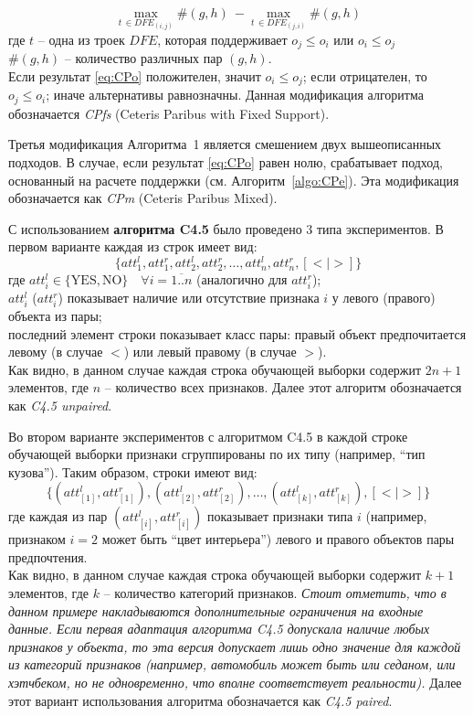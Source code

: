 	\begin{equation}
	\label{eq:CPo}
		\max_{t\, \in DFE_{(i,j)}}\#(g,h) \: - \max_{t\, \in DFE_{(j,i)}}\#(g,h)
	\end{equation}
	где $t$ – одна из троек $DFE$, которая поддерживает $o_j \leq o_i$ или $o_i \leq o_j$\\
	$\#(g,h)$ – количество различных пар $(g,h)$.\\
	Если результат \ref{eq:CPo} положителен, значит $o_i \leq o_j$; если отрицателен, то $o_j \leq o_i$; иначе альтернативы равнозначны. Данная модификация алгоритма обозначается \emph{CPfs} (Ceteris Paribus with Fixed Support).
	
	Третья модификация Алгоритма~1 является смешением двух вышеописанных подходов. В случае, если результат \ref{eq:CPo} равен нолю, срабатывает подход, основанный на расчете поддержки (см. Алгоритм~\ref{algo:CPe}). Эта модификация обозначается как \emph{CPm} (Ceteris Paribus Mixed).
	
	С использованием \textbf{алгоритма C4.5} было проведено 3 типа экспериментов. В первом варианте каждая из строк имеет вид: 
	\begin{equation}
	\label{eq:c4.5_unpaired_row}
	\{att_1^l, att_1^r, att_2^l, att_2^r, \dots, att_n^l, att_n^r, [< | >]\}
	\end{equation}
	где $att_i^l \in \{\text{YES}, \text{NO}\} \quad \forall i = \overline{1..n}$ (аналогично для $att_i^r$); \\
	$att_i^l$ ($att_i^r$) показывает наличие или отсутствие признака $i$ у левого (правого) объекта из пары; \\
	последний элемент строки показывает класс пары: правый объект предпочитается левому (в случае $<$) или левый правому (в случае $>$). \\
	Как видно, в данном случае каждая строка обучающей выборки содержит $2n + 1$ элементов, где $n$ – количество всех признаков. Далее этот алгоритм обозначается как \emph{C4.5 unpaired}.
	
	Во втором варианте экспериментов с алгоритмом C4.5 в каждой строке обучающей выборки признаки сгруппированы по их типу (например, ``тип кузова''). Таким образом, строки имеют вид:
	\begin{equation}
	\label{eq:c4.5_paired_row}
	\{(att_{[1]}^l, att_{[1]}^r), (att_{[2]}^l, att_{[2]}^r), \dots, (att_{[k]}^l, att_{[k]}^r), [< | >]\}
	\end{equation}
	где каждая из пар $(att_{[i]}^l, att_{[i]}^r)$ показывает признаки типа $i$ (например, признаком $i=2$ может быть ``цвет интерьера'') левого и правого объектов пары предпочтения. \\
	Как видно, в данном случае каждая строка обучающей выборки содержит $k + 1$ элементов, где $k$ – количество категорий признаков. \emph{Стоит отметить, что в данном примере накладываются дополнительные ограничения на входные данные. Если первая адаптация алгоритма C4.5 допускала наличие любых признаков у объекта, то эта версия допускает лишь одно значение для каждой из категорий признаков (например, автомобиль может быть или седаном, или хэтчбеком, но не одновременно, что вполне соответствует реальности).} Далее этот вариант использования алгоритма обозначается как \emph{C4.5 paired}.
	
